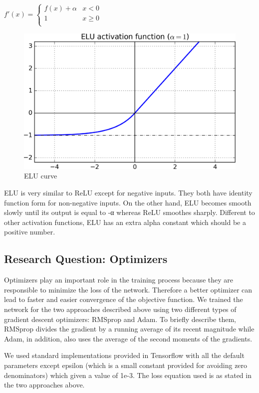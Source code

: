 \documentclass[11pt,a4paper]{article}
\begin{document}
$f'(x) = \begin{cases}
      f(x)+\alpha & x < 0 \\
      1 & x\geq 0 \\
   \end{cases}$
\begin{figure}[htb]
\begin{center}
\includegraphics[width=\columnwidth]{elu.png}
\end{center}
\caption{ELU curve}
\label{fig:figure6}
\end{figure}

ELU is very similar to ReLU except for negative inputs. They both have identity function form for non-negative inputs. On the other hand, ELU becomes smooth slowly until its output is equal to -α whereas ReLU smoothes sharply. Different to other activation functions, ELU has an extra alpha constant which should be a positive number.

\subsection{Research Question: Optimizers}
Optimizers play an important role in the training process because they are responsible to minimize the loss of the network. Therefore a better optimizer can lead to faster and easier convergence of the objective function. We trained the network for the two approaches described above using two different types of gradient descent optimizers: RMSprop and Adam. To briefly describe them, RMSprop divides the gradient by a running average of its recent magnitude while Adam, in addition, also uses the average of the second moments of the gradients.

We used standard implementations provided in Tensorflow with all the default parameters except epsilon (which is a small constant provided for avoiding zero denominators) which given a value of 1e-3. The loss equation used is as stated in the two approaches above.
\end{document}
